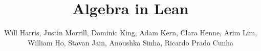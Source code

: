 \title{Algebra in Lean}
\author{Will Harris, Justin Morrill, Dominic King, Adam Kern, Clara Henne, Arim Lim, 
William Ho, Stavan Jain, Anoushka Sinha, Ricardo Prado Cunha}


\maketitle

